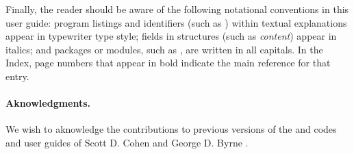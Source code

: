 Finally, the reader should be aware of the following notational conventions
in this user guide:  program listings and identifiers (such as ) 
within textual explanations appear in typewriter type style; 
fields in {\C} structures (such as {\em content}) appear in italics;
and packages or modules, such as {\cvdense}, are written in all capitals. 
In the Index, page numbers that appear in bold indicate the main reference
for that entry.

\paragraph{Aknowledgments.}
We wish to aknowledge the contributions to previous versions of the
{\cvode} and {\pvode} codes and user guides of Scott D. Cohen \cite{CoHi:94}
and George D. Byrne \cite{ByHi:98}.

